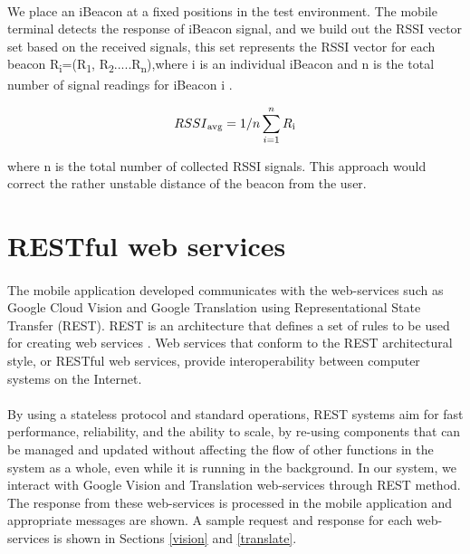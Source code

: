 \documentclass[12pt]{article}
\begin{document}
\paragraph{}We place an iBeacon at a fixed positions in the test environment. The mobile terminal detects the response of iBeacon signal, and we build out the RSSI vector set based on the received signals, this set represents the RSSI vector for each beacon R\textsubscript{i}=(R\textsubscript{1}, R\textsubscript{2}.....R\textsubscript{n}),where i is an individual iBeacon and n is the total number of signal readings for iBeacon i \cite{distanceTrack}.

\begin{equation}
RSSI\textsubscript{avg} = 1/n \sum_{i=1}^n R \textsubscript{i}
\end{equation}

where n is the total number of collected RSSI signals. This approach would correct the rather unstable distance of the beacon from the user. 


\section{RESTful web services}
\paragraph{} The mobile application developed communicates with the web-services such as Google Cloud Vision and Google Translation using Representational State Transfer (REST).  REST is an 
architecture that defines a set of rules to be used for creating web services \cite{rest}. Web services that conform to the REST architectural style, or RESTful web services, provide interoperability between computer systems on the Internet.

\paragraph{}By using a stateless protocol and standard operations, REST systems aim for fast performance, reliability, and the ability to scale, by re-using components that can be managed and updated without affecting the flow of other functions in the system as a whole, even while it is running in the background. In our system, we interact with Google Vision and Translation web-services through REST method. The response from these web-services is processed in the mobile application and appropriate messages are shown. A sample request and response for each web-services is shown in Sections \ref{vision} and \ref{translate}.
\end{document}
